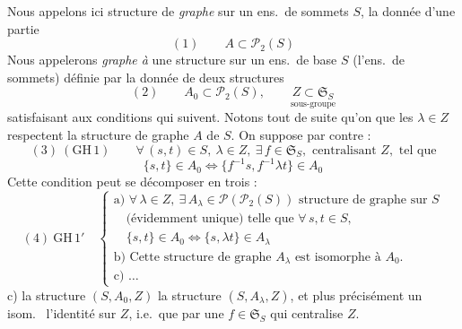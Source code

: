 \documentclass[11pt,a4paper]{article}
\begin{document}
Nous  appelons ici structure de \emph{graphe} sur un ens.\ de sommets $S$, la donnée d'une partie
\[
(1) \qquad A \subset \mathcal{P}_2(S)
\]
Nous appelerons \emph{graphe à  } une structure sur un ens.\ de base $S$ (l'ens.\ de sommets) définie par la donnée de deux structures
\[
(2) \qquad A_0 \subset \mathcal{P}_2(S), \qquad \underset{\text{sous-groupe}}{Z \subset \mathfrak{S}_S}
\]
satisfaisant aux conditions qui suivent. Notons tout de suite qu'on   que  les \struck{\ill{}} $\lambda \in Z$ respectent la structure de graphe \struck{\ill{}} $A$ de $S$. On suppose par contre :
\[
(3)\ (\mathrm{GH}\,1) \qquad \forall\, (s, t) \in S,\ \lambda \in Z,\ \exists\, f \in \mathfrak{S}_S, \text{ centralisant } Z, \text{ tel que}
\]
\[
\{s, t\} \in A_0 \iff \{f^{-1} s, f^{-1} \lambda t\} \in A_0
\]
Cette condition peut se décomposer en trois :
\[
(4)\ \mathrm{GH}\,1' \quad \begin{cases} \text{a) } \forall\, \lambda \in Z,\ \exists\, A_\lambda \in \mathcal{P}(\mathcal{P}_2(S)) \text{ structure de graphe sur } S \\ \quad \text{(évidemment unique) telle que } \forall\, s, t \in S, \\ \quad \{s, t\} \in A_0 \iff \{s, \lambda t\} \in A_\lambda \\ \text{b) Cette structure de graphe } A_\lambda \text{ est isomorphe à } A_0 . \\ \text{c) \ldots} \end{cases}
\]
c)  \ill{} la structure $(S, A_0, Z)$ \ill{} la structure $(S, A_\lambda, Z)$, et plus précisément un isom.\  l'identité sur $Z$, i.e.\ que \struck{\ill{}}  par une $f \in \mathfrak{S}_S$ qui centralise $Z$.
\end{document}
